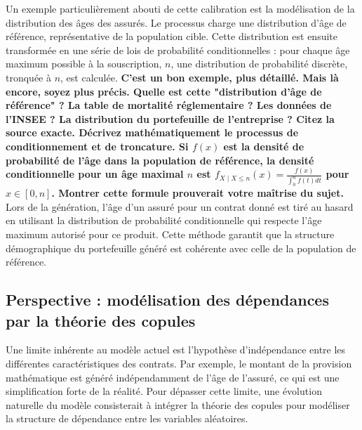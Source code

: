 Un exemple particulièrement abouti de cette calibration est la modélisation de la distribution des âges des assurés. Le processus charge une distribution d'âge de référence, représentative de la population cible. Cette distribution est ensuite transformée en une série de lois de probabilité conditionnelles : pour chaque âge maximum possible à la souscription, $n$, une distribution de probabilité discrète, tronquée à $n$, est calculée. \textbf{C'est un bon exemple, plus détaillé. Mais là encore, soyez plus précis.
    Quelle est cette "distribution d'âge de référence" ? La table de mortalité réglementaire ? Les données de l'INSEE ? La distribution du portefeuille de l'entreprise ? Citez la source exacte.
    Décrivez mathématiquement le processus de conditionnement et de troncature. Si $f(x)$ est la densité de probabilité de l'âge dans la population de référence, la densité conditionnelle pour un âge maximal $n$ est $f_{X \mid X \leq n}(x) = \frac{f(x)}{\int_0^n f(t)dt}$ pour $x \in [0,n]$. Montrer cette formule prouverait votre maîtrise du sujet.}
Lors de la génération, l'âge d'un assuré pour un contrat donné est tiré au hasard en utilisant la distribution de probabilité conditionnelle qui respecte l'âge maximum autorisé pour ce produit. Cette méthode garantit que la structure démographique du portefeuille généré est cohérente avec celle de la population de référence.

\subsection{Perspective : modélisation des dépendances par la théorie des copules}

Une limite inhérente au modèle actuel est l'hypothèse d'indépendance entre les différentes caractéristiques des contrats. Par exemple, le montant de la provision mathématique est généré indépendamment de l'âge de l'assuré, ce qui est une simplification forte de la réalité. Pour dépasser cette limite, une évolution naturelle du modèle consisterait à intégrer la théorie des copules pour modéliser la structure de dépendance entre les variables aléatoires.

